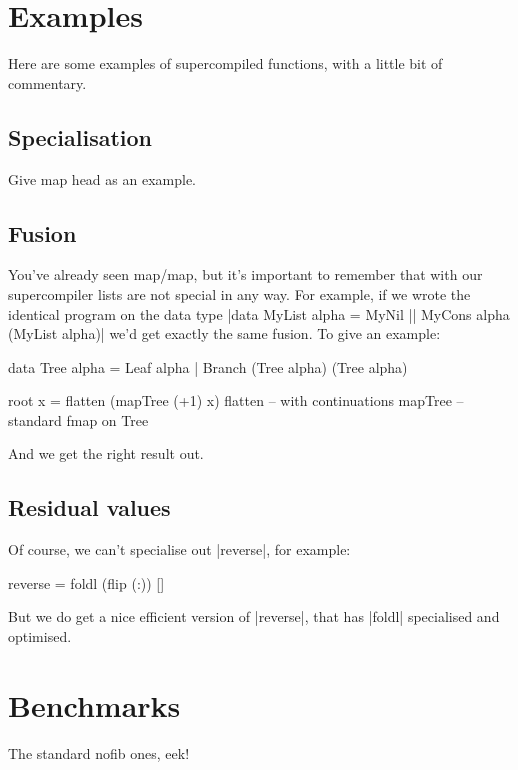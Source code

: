 \documentclass{sigplanconf}
\begin{document}
\section{Examples}
\label{sec:examples}

Here are some examples of supercompiled functions, with a little bit of commentary.

\subsection{Specialisation}

Give map head as an example.

\subsection{Fusion}

You've already seen map/map, but it's important to remember that with our supercompiler lists are not special in any way. For example, if we wrote the identical program on the data type |data MyList alpha = MyNil || MyCons alpha (MyList alpha)| we'd get exactly the same fusion. To give an example:

\begin{code}
data Tree alpha = Leaf alpha | Branch (Tree alpha) (Tree alpha)

root x = flatten (mapTree (+1) x)
flatten -- with continuations
mapTree -- standard fmap on Tree
\end{code}

And we get the right result out.

\subsection{Residual values}

Of course, we can't specialise out |reverse|, for example:

\begin{code}
reverse = foldl (flip (:)) []
\end{code}

But we do get a nice efficient version of |reverse|, that has |foldl| specialised and optimised.

\section{Benchmarks}
\label{sec:benchmarks}

The standard nofib ones, eek!
\end{document}
